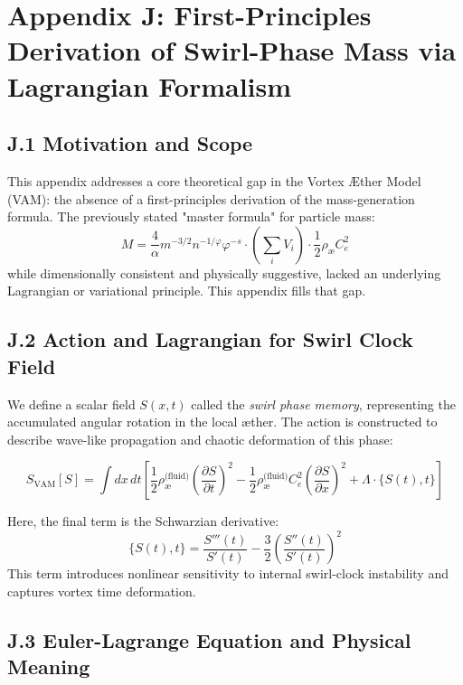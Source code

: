\section*{Appendix J: First-Principles Derivation of Swirl-Phase Mass via Lagrangian Formalism}

\subsection*{J.1 Motivation and Scope}

This appendix addresses a core theoretical gap in the Vortex \AE{}ther Model (VAM): the absence of a first-principles derivation of the mass-generation formula. The previously stated "master formula" for particle mass:
\[
M = \frac{4}{\alpha} m^{-3/2} n^{-1/\varphi} \varphi^{-s} \cdot \left( \sum_i V_i \right) \cdot \frac{1}{2} \rho_{\text{\ae}} C_e^2
\]
while dimensionally consistent and physically suggestive, lacked an underlying Lagrangian or variational principle. This appendix fills that gap.

\subsection*{J.2 Action and Lagrangian for Swirl Clock Field}

We define a scalar field $S(x,t)$ called the \textit{swirl phase memory}, representing the accumulated angular rotation in the local æther. The action is constructed to describe wave-like propagation and chaotic deformation of this phase:

\[
S_{\text{VAM}}[S] = \int dx \, dt \left[
\frac{1}{2} \rho_{\text{\ae}}^{\text{(fluid)}} \left( \frac{\partial S}{\partial t} \right)^2
- \frac{1}{2} \rho_{\text{\ae}}^{\text{(fluid)}} C_e^2 \left( \frac{\partial S}{\partial x} \right)^2
+ \Lambda \cdot \{ S(t), t \}
\right]
\]

Here, the final term is the Schwarzian derivative:
\[
\{S(t), t\} = \frac{S'''(t)}{S'(t)} - \frac{3}{2} \left( \frac{S''(t)}{S'(t)} \right)^2
\]
This term introduces nonlinear sensitivity to internal swirl-clock instability and captures vortex time deformation.

\subsection*{J.3 Euler-Lagrange Equation and Physical Meaning}

